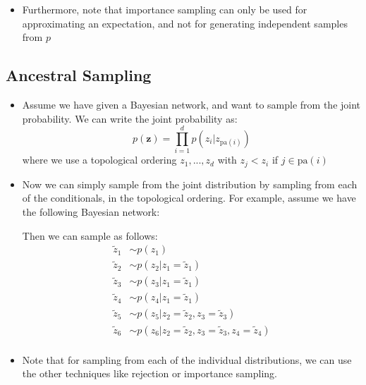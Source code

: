 \begin{itemize}
\begin{itemize}
	\end{itemize}
	\item Furthermore, note that importance sampling can only be used for approximating an expectation, and not for generating independent samples from $p$
\end{itemize}
\subsection{Ancestral Sampling}
\begin{itemize}
	\item Assume we have given a Bayesian network, and want to sample from the joint probability. We can write the joint probability as:
	$$p(\bm{z})=\prod_{i=1}^{d} p(z_i\vert z_{\text{pa}(i)})$$
	where we use a topological ordering $z_1,...,z_d$ with $z_j<z_i$ if $j\in \text{pa}(i)$
	\item Now we can simply sample from the joint distribution by sampling from each of the conditionals, in the topological ordering. For example, assume we have the following Bayesian network:
	
	\begin{figure}[ht!]
		\centering
	\end{figure}

	Then we can sample as follows:
	\begin{equation*}
		\begin{split}
			\tilde{z}_1 & \sim p(z_1)\\
			\tilde{z}_2 & \sim p(z_2|z_1=\tilde{z}_1)\\
			\tilde{z}_3 & \sim p(z_3|z_1=\tilde{z}_1)\\
			\tilde{z}_4 & \sim p(z_4|z_1=\tilde{z}_1)\\
			\tilde{z}_5 & \sim p(z_5|z_2=\tilde{z}_2,z_3=\tilde{z}_3)\\
			\tilde{z}_6 & \sim p(z_6|z_2=\tilde{z}_2,z_3=\tilde{z}_3,z_4=\tilde{z}_4)\\
		\end{split}
	\end{equation*}
	
	\item Note that for sampling from each of the individual distributions, we can use the other techniques like rejection or importance sampling. 
	
\end{itemize}
